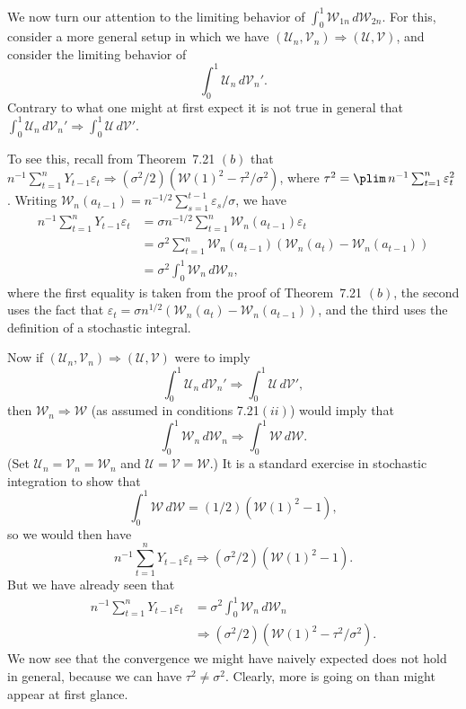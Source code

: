 We now turn our attention to the limiting behavior of $\int_0^1 \mathcal{W}_{1n}\,d\mathcal{W}_{2n}$. For this, consider a more general setup in which we have $(\boldsymbol{\mathcal{U}}_n, \boldsymbol{\mathcal{V}}_n) \Rightarrow (\boldsymbol{\mathcal{U}}, \boldsymbol{\mathcal{V}})$, and consider the limiting behavior of
\[
\int_0^1 \boldsymbol{\mathcal{U}}_n\,d\boldsymbol{\mathcal{V}}_n'.
\]
Contrary to what one might at first expect it is not true in general that $\int_0^1 \boldsymbol{\mathcal{U}}_n\,d\boldsymbol{\mathcal{V}}_n' \Rightarrow \int_0^1 \boldsymbol{\mathcal{U}}\,d\boldsymbol{\mathcal{V}}'$.

To see this, recall from Theorem~7.21 $(b)$ that $n^{-1}\sum_{t=1}^{n} Y_{t-1}\varepsilon_t \Rightarrow (\sigma^2/2)(\mathcal{W}(1)^2 - \tau^2/\sigma^2)$, where $\tau^2 = \plim\, n^{-1}\sum_{t=1}^{n} \varepsilon_t^2$. Writing $\mathcal{W}_n(a_{t-1}) = n^{-1/2}\sum_{s=1}^{t-1} \varepsilon_s / \sigma$, we have
\begin{align*}
n^{-1}\sum_{t=1}^{n} Y_{t-1}\varepsilon_t &= \sigma n^{-1/2}\sum_{t=1}^{n} \mathcal{W}_n(a_{t-1})\varepsilon_t \\
&= \sigma^2 \sum_{t=1}^{n} \mathcal{W}_n(a_{t-1})(\mathcal{W}_n(a_t) - \mathcal{W}_n(a_{t-1})) \\
&= \sigma^2 \int_0^1 \mathcal{W}_n\,d\mathcal{W}_n,
\end{align*}
where the first equality is taken from the proof of Theorem~7.21 $(b)$, the second uses the fact that $\varepsilon_t = \sigma n^{1/2}(\mathcal{W}_n(a_t) - \mathcal{W}_n(a_{t-1}))$, and the third uses the definition of a stochastic integral.

Now if $(\boldsymbol{\mathcal{U}}_n, \boldsymbol{\mathcal{V}}_n) \Rightarrow (\boldsymbol{\mathcal{U}}, \boldsymbol{\mathcal{V}})$ were to imply
\[
\int_0^1 \boldsymbol{\mathcal{U}}_n\,d\boldsymbol{\mathcal{V}}_n' \Rightarrow \int_0^1 \boldsymbol{\mathcal{U}}\,d\boldsymbol{\mathcal{V}}',
\]
then $\mathcal{W}_n \Rightarrow \mathcal{W}$ (as assumed in conditions 7.21$(ii)$) would imply that
\[
\int_0^1 \mathcal{W}_n\,d\mathcal{W}_n \Rightarrow \int_0^1 \mathcal{W}\,d\mathcal{W}.
\]
(Set $\boldsymbol{\mathcal{U}}_n = \boldsymbol{\mathcal{V}}_n = \mathcal{W}_n$ and $\boldsymbol{\mathcal{U}} = \boldsymbol{\mathcal{V}} = \mathcal{W}$.) It is a standard exercise in stochastic integration to show that
\[
\int_0^1 \mathcal{W}\,d\mathcal{W} = (1/2)(\mathcal{W}(1)^2 - 1),
\]
so we would then have
\[
n^{-1}\sum_{t=1}^{n} Y_{t-1}\varepsilon_t \Rightarrow (\sigma^2/2)(\mathcal{W}(1)^2 - 1).
\]
But we have already seen that
\begin{align*}
n^{-1}\sum_{t=1}^{n} Y_{t-1}\varepsilon_t &= \sigma^2 \int_0^1 \mathcal{W}_n\,d\mathcal{W}_n \\
&\Rightarrow (\sigma^2/2)(\mathcal{W}(1)^2 - \tau^2/\sigma^2).
\end{align*}
We now see that the convergence we might have naively expected does not hold in general, because we can have $\tau^2 \neq \sigma^2$. Clearly, more is going on than might appear at first glance.

